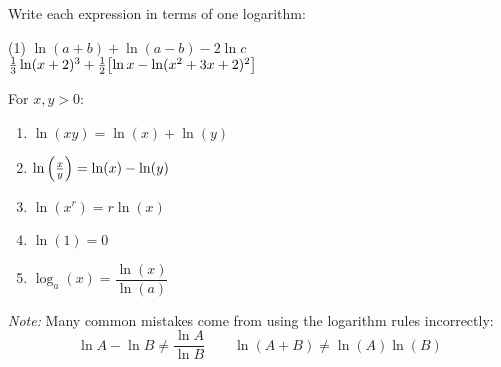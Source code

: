 \documentclass[mathNotesPreamble]{subfiles}
\begin{document}
  \begin{ex*}
    Write each expression in terms of one logarithm:\\
    
    \noindent
    \begin{minipage}{0.55\linewidth}
      \begin{extasks}(1)
        \task $\ln(a+b)+\ln(a-b)-2\ln c$\\[70pt]
        \task $\frac{1}{3}\ln(x+2)^3 +\frac{1}{2}{\left[\ln x-\ln(x^2+3x+2)^2\right]}$\\[30pt]
      \end{extasks}
    \end{minipage}%
    \begin{minipage}{0.45\linewidth}
      \begin{flushright}
        \begin{thmBox*}
          For $x,y>0$:
            \begin{enumerate}
              \item $\ln(xy)=\ln(x)+\ln(y)$
              \item $\ln{\left(\frac{x}{y}\right)}=\ln(x)-\ln(y)$
              \item $\ln(x^r)=r\ln(x)$
              \item $\ln(1)=0$
              \item $\log_a(x)=\dfrac{\ln(x)}{\ln(a)}$
            \end{enumerate}
        \end{thmBox*}
      \end{flushright}
    \end{minipage}
  \end{ex*}

  \begin{center}
    \begin{thmBox*}
      \textit{Note:} Many common mistakes come from using the logarithm rules incorrectly:
      $$\ln A-\ln B\neq \dfrac{\ln A}{\ln B}\qquad \ln(A+B)\neq\ln(A)\ln(B)$$
    \end{thmBox*}
  \end{center}
  \pagebreak
\end{document}
